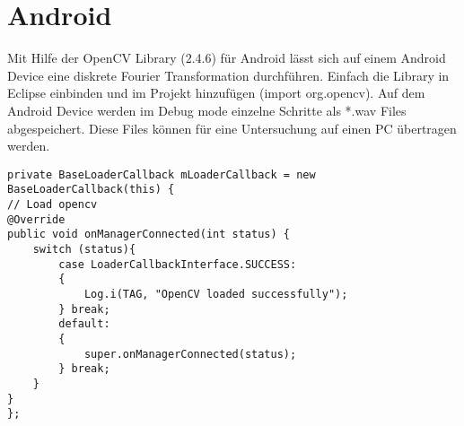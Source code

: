 \documentclass[10pt]{article}
\begin{document}
\clearpage
\newpage
\part{Android}
Mit Hilfe der OpenCV Library (2.4.6) für Android lässt sich auf einem Android Device eine diskrete Fourier Transformation durchführen. Einfach die Library in Eclipse einbinden und im Projekt hinzufügen (import org.opencv). Auf dem Android Device werden im Debug mode einzelne Schritte als *.wav Files abgespeichert. Diese Files können für eine Untersuchung auf einen PC übertragen werden.

\begin{tiny}
\begin{lstlisting}
private BaseLoaderCallback mLoaderCallback = new BaseLoaderCallback(this) {
// Load opencv
@Override
public void onManagerConnected(int status) {
	switch (status){
		case LoaderCallbackInterface.SUCCESS:
		{
			Log.i(TAG, "OpenCV loaded successfully");                  
		} break;
		default:
		{
			super.onManagerConnected(status);
		} break;
	}
}
};
\end{lstlisting}
\end{tiny}
\end{document}
